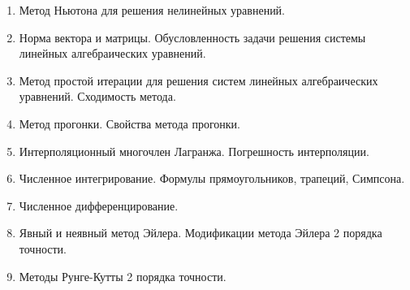 % 
%

\begin{enumerate}
\item Метод Ньютона для решения нелинейных уравнений.

\item Норма вектора и матрицы. Обусловленность задачи решения системы линейных алгебраических уравнений.

\item Метод простой итерации для решения систем линейных алгебраических уравнений. Сходимость метода.

\item Метод прогонки. Свойства метода прогонки.

\item Интерполяционный многочлен Лагранжа. Погрешность интерполяции.

\item Численное интегрирование. Формулы прямоугольников, трапеций, Симпсона.

\item Численное дифференцирование.

\item Явный и неявный метод Эйлера. Модификации метода Эйлера 2 порядка точности.

\item Методы Рунге-Кутты 2 порядка точности.
\end{enumerate}